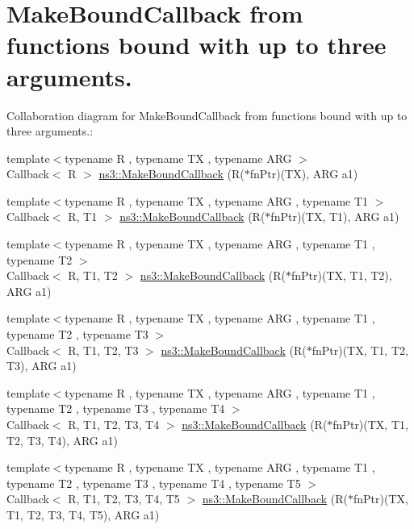 \hypertarget{group__makeboundcallback}{}\section{Make\+Bound\+Callback from functions bound with up to three arguments.}
\label{group__makeboundcallback}
Collaboration diagram for Make\+Bound\+Callback from functions bound with up to three arguments.\+:
\begin{DoxyCompactItemize}
\item 
{\footnotesize template$<$typename R , typename TX , typename A\+RG $>$ }\\Callback$<$ R $>$ \hyperlink{group__makeboundcallback_ga1725d6362e6065faa0709f7c93f8d770}{ns3\+::\+Make\+Bound\+Callback} (R($\ast$fn\+Ptr)(TX), A\+RG a1)
\item 
{\footnotesize template$<$typename R , typename TX , typename A\+RG , typename T1 $>$ }\\Callback$<$ R, T1 $>$ \hyperlink{group__makeboundcallback_ga2caf25752823feba5a439ff931eebf5b}{ns3\+::\+Make\+Bound\+Callback} (R($\ast$fn\+Ptr)(TX, T1), A\+RG a1)
\item 
{\footnotesize template$<$typename R , typename TX , typename A\+RG , typename T1 , typename T2 $>$ }\\Callback$<$ R, T1, T2 $>$ \hyperlink{group__makeboundcallback_ga6c05e6cd73d7a01a3bebb6832fbddd30}{ns3\+::\+Make\+Bound\+Callback} (R($\ast$fn\+Ptr)(TX, T1, T2), A\+RG a1)
\item 
{\footnotesize template$<$typename R , typename TX , typename A\+RG , typename T1 , typename T2 , typename T3 $>$ }\\Callback$<$ R, T1, T2, T3 $>$ \hyperlink{group__makeboundcallback_ga98bdf168a29ebed56ec0e349a6f7a32e}{ns3\+::\+Make\+Bound\+Callback} (R($\ast$fn\+Ptr)(TX, T1, T2, T3), A\+RG a1)
\item 
{\footnotesize template$<$typename R , typename TX , typename A\+RG , typename T1 , typename T2 , typename T3 , typename T4 $>$ }\\Callback$<$ R, T1, T2, T3, T4 $>$ \hyperlink{group__makeboundcallback_gab37d1775d8c786e6ec905146f60cd0a1}{ns3\+::\+Make\+Bound\+Callback} (R($\ast$fn\+Ptr)(TX, T1, T2, T3, T4), A\+RG a1)
\item 
{\footnotesize template$<$typename R , typename TX , typename A\+RG , typename T1 , typename T2 , typename T3 , typename T4 , typename T5 $>$ }\\Callback$<$ R, T1, T2, T3, T4, T5 $>$ \hyperlink{group__makeboundcallback_gad36f982d18b34512b9fff256fef7b94d}{ns3\+::\+Make\+Bound\+Callback} (R($\ast$fn\+Ptr)(TX, T1, T2, T3, T4, T5), A\+RG a1)

\end{DoxyCompactItemize}
